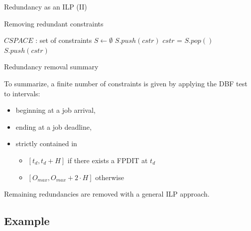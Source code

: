 \documentclass{beamer}
\begin{document}
    \begin{frame}{Redundancy as an ILP (II)}

        \begin{algorithm}[H]
            \caption{Removing redundant constraints}
            \label{alg:pruneCspace}
          \begin{algorithmic}[1]
            \STATE $CSPACE$ : set of constraints
            \STATE $S \leftarrow \emptyset$
            \STATE {}
                \STATE $S.push(cstr)$
              \ENDIF
            \ENDFOR
            \STATE {}
              \STATE $cstr$ = $S.pop()$
                \STATE $S.push(cstr)$
              \ENDIF
            \ENDFOR
            \end{algorithmic}
        \end{algorithm}
    \end{frame}

	\begin{frame}{Redundancy removal summary}

		To summarize, a finite number of constraints is given by applying the DBF test to intervals:
		\begin{itemize}
			\item beginning at a job arrival,
			\item ending at a job deadline,
			\item strictly contained in
			\begin{itemize}
				\item $[t_d, t_d + H]$ if there exists a FPDIT at $t_d$
				\item $[O_{max}, O_{max} + 2 \cdot H]$ otherwise
			\end{itemize}
		\end{itemize}

		Remaining redundancies are removed with a general ILP approach.

	\end{frame}


    \subsection{Example}
\end{document}
